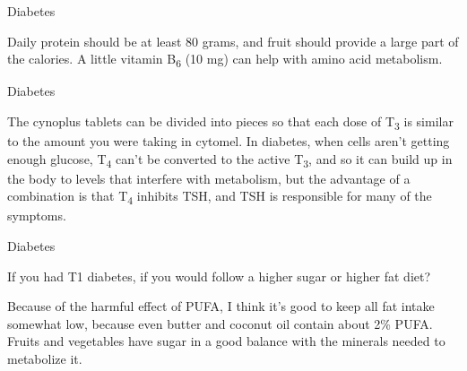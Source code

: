 \documentclass[11pt,oneside,openany,extrafontsizes]{memoir}
\begin{document}
\begin{standalonequote}{Diabetes}

    \begin{answer}
        Daily protein should be at least 80 grams, and fruit should provide a large part of the calories. A little vitamin B\textsubscript{6} (10 mg) can help with amino acid metabolism. 
    \end{answer}
\end{standalonequote}

\begin{standalonequote}{Diabetes}

    \begin{answer}
        The cynoplus tablets can be divided into pieces so that each dose of T\textsubscript{3} is similar to the amount you were taking in cytomel. In diabetes, when cells aren't getting enough glucose, T\textsubscript{4} can't be converted to the active T\textsubscript{3}, and so it can build up in the body to levels that interfere with metabolism, but the advantage of a combination is that T\textsubscript{4} inhibits TSH, and TSH is responsible for many of the symptoms.
    \end{answer}
\end{standalonequote}

\begin{qaexchange}{Diabetes}

    \begin{question}
         If you had T1 diabetes, if you would follow a higher sugar or higher fat diet?
    \end{question}

    \begin{answer}
      Because of the harmful effect of PUFA, I think it's good to keep all fat intake somewhat low, because even butter and coconut oil contain about 2\% PUFA. Fruits and vegetables have sugar in a good balance with the minerals needed to metabolize it.
    \end{answer}
\end{qaexchange}
\end{document}
